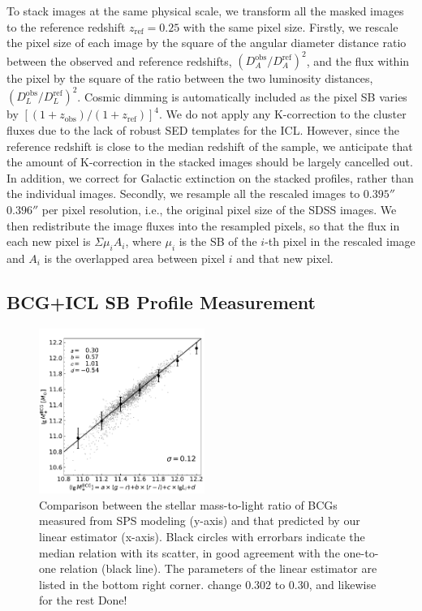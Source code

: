 \documentclass[fleqn,usenatbib]{mnras}
\newcommand\ying[1]{{\color{red} {#1}}}
\newcommand\xkchen[1]{{\color{cyan} {#1}}}
\begin{document}
To stack images at the same physical scale, we transform all the masked
images to the reference redshift $z_{\mathrm{ref}}{=}0.25$ with the same
pixel size. Firstly, we rescale the pixel size of each image by the square
of the angular diameter distance ratio between the observed and reference
redshifts, $(D_A^{\mathrm{obs}}/D_A^{\mathrm{ref}})^2$, and the flux within
the pixel by the square of the ratio between the two luminosity distances,
$(D_L^{\mathrm{obs}}/D_L^{\mathrm{ref}})^{2}$. Cosmic dimming is
automatically included as the pixel SB varies by
$[(1+z_{\mathrm{obs}})/(1+z_{\mathrm{ref}})]^4$. We do not apply any
K-correction to the cluster fluxes due to the lack of robust SED templates
for the ICL. However, since the reference redshift is close to the median
redshift of the sample, we anticipate that the amount of K-correction in
the stacked images should be largely cancelled out. In addition, we correct
for Galactic extinction on the stacked profiles, rather than the individual
images. Secondly, we resample all the rescaled images to $0.395''$\xkchen{$0.396''$} per
pixel resolution, i.e., the original pixel size of the SDSS images. We then
redistribute the image fluxes into the resampled pixels, so that the flux
in each new pixel is $\Sigma \mu_i A_{i}$, where $\mu_i$ is the SB of the
$i$-th pixel in the rescaled image and $A_{i}$ is the overlapped area
between pixel $i$ and that new pixel.



\subsection{BCG+ICL SB Profile Measurement}
\label{subsec:sbprofile}

\begin{figure}
    \includegraphics[width=0.48\textwidth]{fig/Mass-to-Li_estimation.pdf}
    \caption{Comparison between the stellar mass-to-light ratio of BCGs
    measured from SPS modeling (y-axis) and that predicted by our linear
    estimator (x-axis). Black circles with errorbars indicate the median
    relation with its scatter, in good agreement with the one-to-one
    relation (black line). The parameters of the linear estimator are
    listed in the bottom right corner.
    \ying{change 0.302 to 0.30, and likewise for the rest} \xkchen{Done!}
    \label{fig:func_M2L} }
\end{figure}
\end{document}
